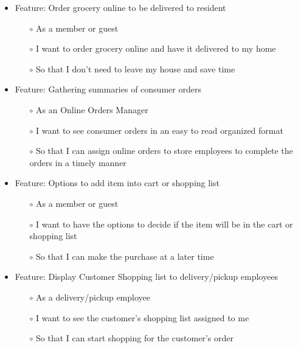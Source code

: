 \documentclass{scrreprt}
\begin{document}
\begin{itemize}
	\item Feature: Order grocery online to be delivered to resident 
	\begin{itemize}
		\item[$\circ$]As a member or guest 
		\item[$\circ$]I want to order grocery online and have it delivered to my home  
		\item[$\circ$]So that I don’t need to leave my house and save time 
	\end{itemize}
\end{itemize}

\begin{itemize}
	\item Feature: Gathering summaries of consumer orders
	\begin{itemize}
		\item[$\circ$]As an Online Orders Manager
		\item[$\circ$]I want to see consumer orders in an easy to read organized format
		\item[$\circ$]So that I can assign online orders to store employees to complete the orders in a timely manner
	\end{itemize}
\end{itemize}

\begin{itemize}
	\item Feature: Options to add item into cart or shopping list
	\begin{itemize}
		\item[$\circ$]As a member or guest
		\item[$\circ$]I want to have the options to decide if the item will be in the cart or shopping list
		\item[$\circ$]So that I can make the purchase at a later time
	\end{itemize}
\end{itemize}

\begin{itemize}
	\item Feature: Display Customer Shopping list to delivery/pickup employees
	\begin{itemize}
		\item[$\circ$]As a delivery/pickup employee
		\item[$\circ$]I want to see the customer’s shopping list assigned to me
		\item[$\circ$]So that I can start shopping for the customer’s order
	\end{itemize}
\end{itemize}
\end{document}
